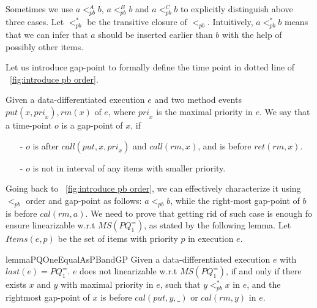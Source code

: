 Sometimes we use $a <_{\textit{pb}}^A b$, $a <_{\textit{pb}}^B b$ and $a <_{\textit{pb}}^C b$ to explicitly distinguish above three cases. Let $<_{\textit{pb}}^*$ be the transitive closure of $<_{\textit{pb}}$. Intuitively, $a <_{\textit{pb}}^* b$ means that we can infer that $a$ should be inserted earlier than $b$ with the help of possibly other items.

Let us introduce gap-point to formally define the time point in dotted line of \figurename~\ref{fig:introduce pb order}.


\begin{definition}\label{def:gap-point for matched put and rm operations}
Given a data-differentiated execution $e$ and two method events $\textit{put}(x,\textit{pri}_x),\textit{rm}(x)$ of $e$, where $\textit{pri}_x$ is the maximal priority in $e$. We say that a time-point $o$ is a gap-point of $x$, if

\begin{itemize}
\setlength{\itemsep}{0.5pt}
\item[-] $o$ is after $\textit{call}(\textit{put},x,\textit{pri}_x)$ and $\textit{call}(\textit{rm},x)$, and is before $\textit{ret}(\textit{rm},x)$.

\item[-] $o$ is not in interval of any items with smaller priority.
\end{itemize}
\end{definition}

Going back to \figurename~\ref{fig:introduce pb order}, we can effectively characterize it using $<_{\textit{pb}}$ order and gap-point as follows: $a <_{\textit{pb}} b$, while the right-most gap-point of $b$ is before $\textit{cal}(\textit{rm},a)$. We need to prove that getting rid of such case is enough fo ensure linearizable w.r.t $\textit{MS}(\textit{PQ}_1^{=})$, as stated by the following lemma. Let $\textit{Items}(e,p)$ be the set of items with priority $p$ in execution $e$.


\begin{restatable}{lemma}{PQOneEqualAsPBandGP}
\label{lemma:PQ1Equal as pb order and gap-point}
Given a data-differentiated execution $e$  with $\textit{last}(e) = \textit{PQ}_1^{=}$. $e$ does not linearizable w.r.t $\textit{MS}(\textit{PQ}_1^{=})$, if and only if there exists $x$ and $y$ with maximal priority in $e$, such that $y <_{\textit{pb}}^* x$ in $e$, and the rightmost gap-point of $x$ is before $\textit{cal}(\textit{put},y,\_)$ or $\textit{cal}(\textit{rm},y)$ in $e$.
\end{restatable}

